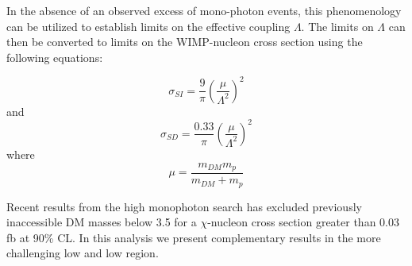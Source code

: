 {In the absence of an observed excess of mono-photon events, this  phenomenology can be utilized to establish limits on the effective coupling $\Lambda$. The limits on $\Lambda$ can then be converted to limits on the WIMP-nucleon cross section using the following equations:

\begin{equation}
\sigma_{SI}=\frac{9}{\pi}(\frac{\mu}{\Lambda^2})^2
\end{equation}
and
\begin{equation}
\sigma_{SD}=\frac{0.33}{\pi}(\frac{\mu}{\Lambda^2})^2
\end{equation}
where
\begin{equation}
\mu = \frac{m_{DM} m_p}{m_{DM} + m_p}
\end{equation}

Recent results from the high \pt monophoton search has excluded previously inaccessible DM masses below 3.5 \GeV for a $\chi$-nucleon cross section greater than 0.03 fb at 90\% CL. In this analysis we present complementary results in the more challenging low \pt and low \met region.

}